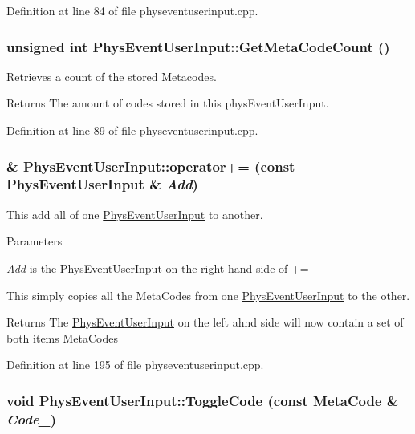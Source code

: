Definition at line 84 of file physeventuserinput.cpp.\hypertarget{classPhysEventUserInput_a86df812a38566a572134100a422a8799}{
\subsubsection[{GetMetaCodeCount}]{\setlength{\rightskip}{0pt plus 5cm}unsigned int PhysEventUserInput::GetMetaCodeCount ()}}
\label{dc/d0e/classPhysEventUserInput_a86df812a38566a572134100a422a8799}


Retrieves a count of the stored Metacodes. \begin{DoxyReturn}{Returns}
The amount of codes stored in this physEventUserInput. 
\end{DoxyReturn}


Definition at line 89 of file physeventuserinput.cpp.\hypertarget{classPhysEventUserInput_a257c2e093b5736324e39d5fac0d6de2a}{
\subsubsection[{operator+=}]{ \& PhysEventUserInput::operator+= (const {\bf PhysEventUserInput} \& {\em Add})}}
\label{dc/d0e/classPhysEventUserInput_a257c2e093b5736324e39d5fac0d6de2a}


This add all of one \hyperlink{classPhysEventUserInput}{PhysEventUserInput} to another. 
\begin{DoxyParams}{Parameters}
\item[{\em Add}]is the \hyperlink{classPhysEventUserInput}{PhysEventUserInput} on the right hand side of +=\end{DoxyParams}
This simply copies all the MetaCodes from one \hyperlink{classPhysEventUserInput}{PhysEventUserInput} to the other. \begin{DoxyReturn}{Returns}
The \hyperlink{classPhysEventUserInput}{PhysEventUserInput} on the left ahnd side will now contain a set of both items MetaCodes 
\end{DoxyReturn}


Definition at line 195 of file physeventuserinput.cpp.\hypertarget{classPhysEventUserInput_a8325bb0172db6ea02fd06f4a5d1a7378}{
\subsubsection[{ToggleCode}]{\setlength{\rightskip}{0pt plus 5cm}void PhysEventUserInput::ToggleCode (const {\bf MetaCode} \& {\em Code\_\-})}}
\label{dc/d0e/classPhysEventUserInput_a8325bb0172db6ea02fd06f4a5d1a7378}



